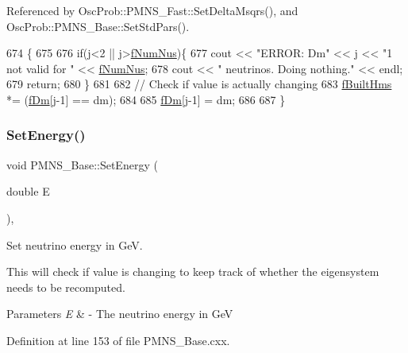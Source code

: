 Referenced by Osc\+Prob\+::\+P\+M\+N\+S\+\_\+\+Fast\+::\+Set\+Delta\+Msqrs(), and Osc\+Prob\+::\+P\+M\+N\+S\+\_\+\+Base\+::\+Set\+Std\+Pars().


\begin{DoxyCode}
674 \{
675 
676   \textcolor{keywordflow}{if}(j<2 || j>\hyperlink{classOscProb_1_1PMNS__Base_a24bb74bed63569dfe88b18fa6a08060e}{fNumNus})\{
677     cout << \textcolor{stringliteral}{"ERROR: Dm"} << j << \textcolor{stringliteral}{"1 not valid for "} << \hyperlink{classOscProb_1_1PMNS__Base_a24bb74bed63569dfe88b18fa6a08060e}{fNumNus};
678     cout << \textcolor{stringliteral}{" neutrinos. Doing nothing."} << endl;
679     \textcolor{keywordflow}{return};
680   \}
681 
682   \textcolor{comment}{// Check if value is actually changing}
683   \hyperlink{classOscProb_1_1PMNS__Base_a9ac3cadeac8db1b90f3152f476244780}{fBuiltHms} *= (\hyperlink{classOscProb_1_1PMNS__Base_a406a31c3b5d620e5a0cace5b411f9f70}{fDm}[j-1] == dm);
684 
685   \hyperlink{classOscProb_1_1PMNS__Base_a406a31c3b5d620e5a0cace5b411f9f70}{fDm}[j-1] = dm;
686 
687 \}
\end{DoxyCode}
\mbox{\label{classOscProb_1_1PMNS__Base_a95b3b0d0cab5e6a54b5ef99587f837c0}} 
\subsubsection{\texorpdfstring{Set\+Energy()}{SetEnergy()}}
{\footnotesize\ttfamily void P\+M\+N\+S\+\_\+\+Base\+::\+Set\+Energy (\begin{DoxyParamCaption}\item[{double}]{E }\end{DoxyParamCaption})\hspace{0.3cm}{\ttfamily [virtual]}, {\ttfamily [inherited]}}

Set neutrino energy in GeV.

This will check if value is changing to keep track of whether the eigensystem needs to be recomputed.


\begin{DoxyParams}{Parameters}
{\em E} & -\/ The neutrino energy in GeV \\
\hline
\end{DoxyParams}


Definition at line 153 of file P\+M\+N\+S\+\_\+\+Base.\+cxx.



